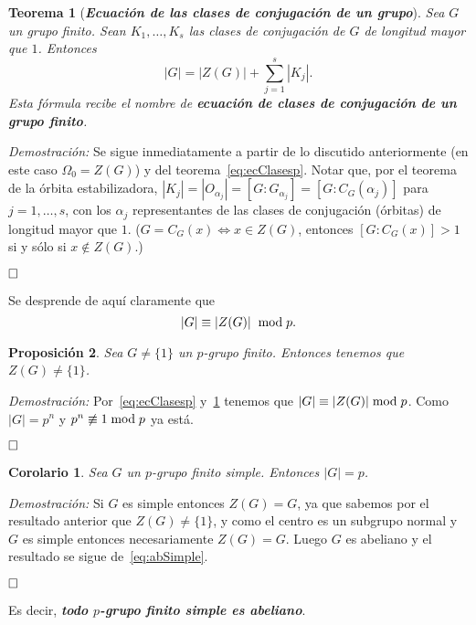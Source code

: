 \documentclass[12pt]{article}
\newtheorem{theorem}{Teorema}[section]
\newtheorem{proposition}[theorem]{Proposición}
\newtheorem{corolario}{Corolario}[theorem]
\begin{document}
\begin{theorem}[\textit{\textbf{Ecuación de las clases de conjugación de un grupo}}] \label{eq:ecClases}
Sea $G$ un grupo finito. Sean $K_{1}, \ldots, K_{s}$ las clases de conjugación de $G$ de longitud mayor que $1$. Entonces $$|G| = |Z(G)| + \sum_{j=1}^{s} |K_{j}|.$$ Esta fórmula recibe el nombre de \textbf{ecuación de clases de conjugación de un grupo finito}.
\end{theorem} 
\emph{Demostración: } Se sigue inmediatamente a partir de lo discutido anteriormente (en este caso $\Omega_0 = Z(G)$) y del teorema~\ref{eq:ecClasesp}. Notar que, por el teorema de la órbita estabilizadora, $|K_{j}| = |O_{\alpha_{j}}| = [G:G_{\alpha_{j}}] = [G:C_{G}(\alpha_{j})]$ para $j=1, \ldots, s$, con los $\alpha_{j}$ representantes de las clases de conjugación (órbitas) de longitud mayor que $1$.   ($G = C_{G}(x) \Longleftrightarrow x \in Z(G)$, entonces $\left[ G:C_{G}(x) \right] > 1$ si y sólo si $x \notin Z(G)$.)

$\hfill \square$

Se desprende de aquí claramente que $$|G| \equiv |Z(G)| \hspace{0.2cm}  \text{mod} \hspace{0.1cm} p.$$

\begin{proposition}Sea $G \neq \lbrace 1 \rbrace$ un $p$-grupo finito. Entonces tenemos que $Z(G) \neq \lbrace 1 \rbrace$.
\end{proposition}
\emph{Demostración: }Por~\ref{eq:ecClasesp} y~\ref{eq:ecClases} tenemos que $|G| \equiv |Z(G)|\hspace{0.1cm}\text{mod}\hspace{0.1cm} p$. Como $|G| = p^n$ y $p^n \not\equiv 1 \hspace{0.1cm}\text{mod}\hspace{0.1cm}p$ ya está.

$\hfill \square$

\begin{corolario}Sea $G$ un $p$-grupo finito simple. Entonces $|G| = p$.
\end{corolario}
\emph{Demostración: }Si $G$ es simple entonces $Z(G) = G$, ya que sabemos por el resultado anterior que $Z(G) \neq \lbrace 1 \rbrace$, y como el centro es un subgrupo normal y $G$ es simple entonces necesariamente $Z(G) = G$. Luego $G$ es abeliano y el resultado se sigue de~\ref{eq:abSimple}.

$\hfill \square$

Es decir, \textbf{\textit{todo $p$-grupo finito simple es abeliano}}.
\end{document}
